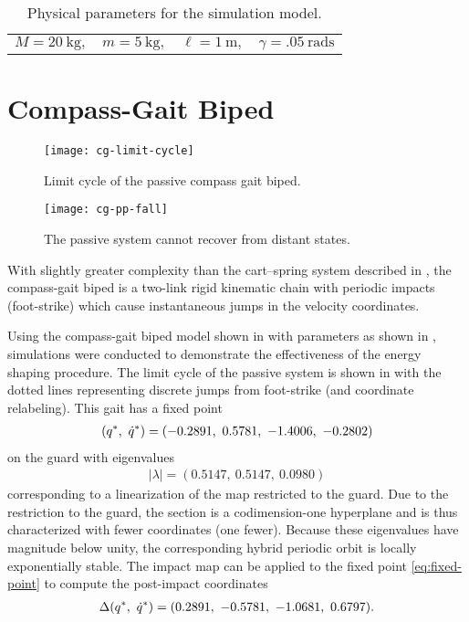 \begin{table}[t]
  \caption{Physical parameters for the simulation model.}
  \label{tab:mparam}
  \centering
  \begin{tabular}{c c c c}
    $M =20 \ \mathrm{kg},$ &
    $m = 5 \ \mathrm{kg},$ &
    $\ell = 1 \ \mathrm{m},$ &
    $\gamma = .05 \ \mathrm{rads}$
  \end{tabular}
  \vspace{-1em}
\end{table}

\section{Compass-Gait Biped}

\begin{figure}[p!]
  \centering
  \texttt{[image: cg-limit-cycle]}
  \caption{Limit cycle of the passive compass gait biped.}
  \label{fig:lc}
\end{figure}

\begin{figure}[p!]
  \centering
  \texttt{[image: cg-pp-fall]}
  \caption{The passive system cannot recover from distant states.}
  \label{fig:pp-fall}
\end{figure}

With slightly greater complexity than the cart--spring system described in
, the compass-gait biped is a two-link rigid kinematic
chain with periodic impacts (foot-strike) which cause instantaneous jumps in the
velocity coordinates.

Using the compass-gait biped model shown in  with
parameters as shown in , simulations were conducted to
demonstrate the effectiveness of the energy shaping procedure.
%
The limit cycle of the passive system is shown in  with the
dotted lines representing discrete jumps from foot-strike (and coordinate
relabeling).
%
This gait has a fixed point
%
\begin{align}
  \label{eq:fixed-point}
  (q^{*}, \ \dot{q}^{*}) = (-0.2891, \ 0.5781, \ -1.4006, \ -0.2802)
\end{align}
%
on the guard with eigenvalues
%
\begin{align}
  |\lambda| = (0.5147, \ 0.5147, \ 0.0980)
\end{align}
%
corresponding to a linearization of the \Poincare{} map restricted to the guard.
%
Due to the restriction to the guard, the \Poincare{} section is a
codimension-one hyperplane and is thus characterized with fewer coordinates (one
fewer).
%
Because these eigenvalues have magnitude below unity, the corresponding hybrid
periodic orbit is locally exponentially stable.
%
The impact map can be applied to the fixed point \eqref{eq:fixed-point} to
compute the post-impact coordinates
%
\begin{align}
  \label{eq:fixed-point-post-impact}
  \Delta(q^{*}, \ \dot{q}^{*}) = (0.2891, \ -0.5781, \ -1.0681, \ 0.6797).
\end{align}

